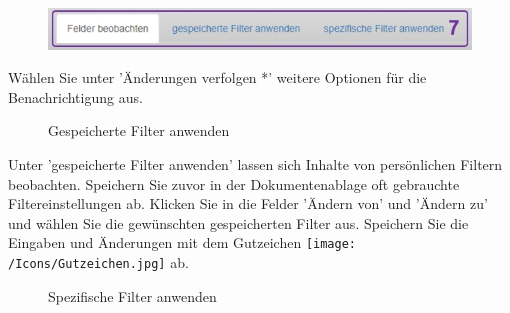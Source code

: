 \vspace{\baselineskip}

\begin{figure}  
  \vspace{-10pt} 
  \begin{center}
    \includegraphics[width=1\linewidth]{../chapters/02_GettingStarted/pictures/getS_weitereOptionen.jpg}
  \end{center}
  \vspace{-20pt}
  \vspace{-10pt}
\end{figure}

Wählen Sie unter 'Änderungen verfolgen *'  weitere Optionen für die Benachrichtigung aus.

\vspace{\baselineskip}

\begin{figure}[H]
\caption{Gespeicherte Filter anwenden}
\end{figure}

Unter 'gespeicherte Filter anwenden' lassen sich Inhalte von persönlichen Filtern beobachten. Speichern Sie zuvor in der Dokumentenablage oft gebrauchte Filtereinstellungen ab. Klicken Sie in die Felder 'Ändern von' und 'Ändern zu' und wählen Sie die gewünschten gespeicherten Filter aus. Speichern Sie die Eingaben und Änderungen mit dem Gutzeichen \texttt{[image: /Icons/Gutzeichen.jpg]} ab.

\begin{figure}[H]
\caption{Spezifische Filter anwenden}
\end{figure}

